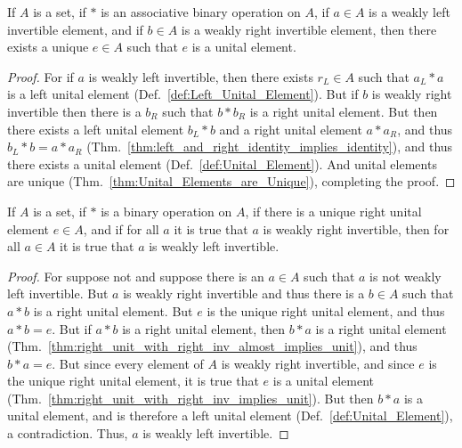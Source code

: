     \begin{theorem}
        \label{thm:existence_of_weak_left_and_weak_right_implies_unital}%
        If $A$ is a set, if $*$ is an associative binary operation on $A$, if
        $a\in{A}$ is a weakly left invertible element, and if $b\in{A}$ is a
        weakly right invertible element, then there exists a unique $e\in{A}$
        such that $e$ is a unital element.
    \end{theorem}
    \begin{proof}
        For if $a$ is weakly left invertible, then there exists $r_{L}\in{A}$
        such that $a_{L}*a$ is a left unital element
        (Def.~\ref{def:Left_Unital_Element}). But if $b$ is weakly right
        invertible then there is a $b_{R}$ such that $b*b_{R}$ is a right
        unital element. But then there exists a left unital element
        $b_{L}*b$ and a right unital element $a*a_{R}$, and thus
        $b_{L}*b=a*a_{R}$
        (Thm.~\ref{thm:left_and_right_identity_implies_identity}), and thus
        there exists a unital element (Def.~\ref{def:Unital_Element}). And
        unital elements are unique (Thm.~\ref{thm:Unital_Elements_are_Unique}),
        completing the proof.
    \end{proof}
    \begin{theorem}
        \label{thm:unique_r_id_and_weak_r_inv_implies_weak_l_inv}%
        If $A$ is a set, if $*$ is a binary operation on $A$, if there is a
        unique right unital element $e\in{A}$, and if for all $a$ it is true
        that $a$ is weakly right invertible, then for all $a\in{A}$ it is true
        that $a$ is weakly left invertible.
    \end{theorem}
    \begin{proof}
        For suppose not and suppose there is an $a\in{A}$ such that $a$ is not
        weakly left invertible. But $a$ is weakly right invertible and thus
        there is a $b\in{A}$ such that $a*b$ is a right unital element. But
        $e$ is the unique right unital element, and thus $a*b=e$. But if
        $a*b$ is a right unital element, then $b*a$ is a right unital element
        (Thm.~\ref{thm:right_unit_with_right_inv_almost_implies_unit}), and
        thus $b*a=e$. But since every element of $A$ is weakly right invertible,
        and since $e$ is the unique right unital element, it is true that
        $e$ is a unital element
        (Thm.~\ref{thm:right_unit_with_right_inv_implies_unit}). But then
        $b*a$ is a unital element, and is therefore a left unital element
        (Def.~\ref{def:Unital_Element}), a contradiction. Thus, $a$ is weakly
        left invertible.
    \end{proof}
